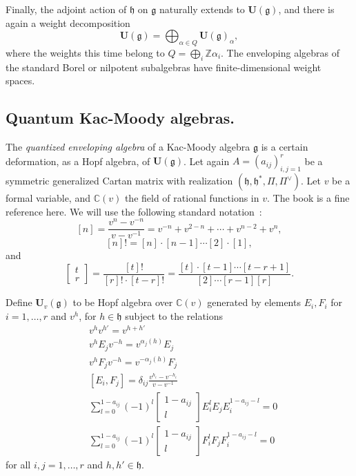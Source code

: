 \documentclass[a4paper,10pt]{amsart}
\def\Z{\mathbb{Z}}
\def\U{\mathbf{U}}
\def\a{\alpha}
\def\C{\mathbb{C}}
\def\g{\mathfrak{g}}
\def\h{\mathfrak{h}}
\numberwithin{equation}{section}
\begin{document}
{\vspace{.2in}

Finally, the adjoint action of $\h$ on $\g$ naturally extends to $\U(\g)$, and there is again a weight decomposition
$$\U(\g) = \bigoplus_{\a \in Q} \U(\g)_{\a},$$
where the weights this time belong to $Q=\bigoplus_i \Z \a_i$.
The enveloping algebras of the standard Borel or nilpotent subalgebras have finite-dimensional weight spaces.

\vspace{.2in}

\subsection{Quantum Kac-Moody algebras.}

\vspace{.15in}

The \textit{quantized enveloping algebra} of a Kac-Moody algebra $\g$ is a certain deformation, as a Hopf algebra, of $\U(\g)$. Let again $A=(a_{ij})_{i,j=1}^r$ be a symmetric generalized Cartan matrix with realization $(\h,\h^*,\Pi,\Pi^{\vee})$.
Let $v$ be a formal variable, and $\C(v)$ the field of rational functions in $v$. The book \cite{Jantzen} is a fine reference here. We will use the following standard notation~:
$$[n]=\frac{v^n-v^{-n}}{v-v^{-1}}= v^{-n} + v^{2-n} + \cdots + v^{n-2} + v^n, $$
$$ [n]!=[n] \cdot [n-1] \cdots [2] \cdot [1],$$
and
$$\begin{bmatrix} t\\ r \end{bmatrix}=\frac{[t]!}{[r]!\cdot [t-r]!}=\frac{[t] \cdot [t-1] \cdots [t-r+1]}{[2] \cdots [r-1][r]}.$$

\vspace{.15in}

Define $\U_v(\g)$ to be Hopf algebra over $\C(v)$ generated by elements $E_i, F_i$ for $i=1, \ldots, r$ and $v^h$, for $h \in \h$ subject to the relations
\begin{equation}\label{E:quantumSerrerel}
\begin{split}
&v^h  v^{h'}=v^{h+h'}  \\
&v^h E_j v^{-h}=v^{\a_{j}(h)} E_j  \\
&v^h F_j v^{-h}=v^{-\a_{j}(h)} F_j \\
&[E_i,F_j]= \delta_{ij} \frac{v^{h_i}-v^{-h_i}}{v -v^{-1}}\\
&\sum_{l=0}^{1-a_{ij}} (-1)^l \begin{bmatrix} 1-a_{ij} \\ l \end{bmatrix} E_i^l E_j E_i^{1-a_{ij}-l}=0  \\
&\sum_{l=0}^{1-a_{ij}} (-1)^l \begin{bmatrix} 1-a_{ij} \\ l \end{bmatrix} F_i^l F_j F_i^{1-a_{ij}-l}=0
\end{split}
\end{equation}
for all $i,j=1, \ldots, r$ and $h, h' \in \h$.

}
\end{document}
